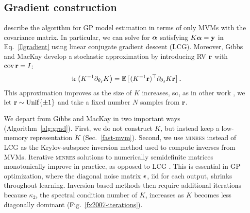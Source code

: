 \documentclass{article}
\begin{document}
\subsection{Gradient construction}

\citet{gibbs1996cient} describe the algorithm for GP model estimation in terms of only MVMs with the covariance matrix. In particular, we can solve for ${\boldsymbol\alpha}$ satisfying $K{\boldsymbol\alpha}=\textbf{y}$ in Eq.~\ref{llgradient} using linear conjugate gradient descent (LCG). Moreover, Gibbs and MacKay develop a stochastic approximation by introducing RV ${\textbf{r}}$ with $\operatorname{cov} {\textbf{r}}=I$:
\begin{align}
  \operatorname{tr}\left({K^{-1}\partial_{\theta_j}K}\right) = \operatorname{\mathbb{E}}\left[(K^{-1}{\textbf{r}})^\top\partial_{\theta_j}K{\textbf{r}}\right]\label{eq:trace}.
\end{align}
This approximation improves as the size of $K$ increases, so, as in other work \cite{cutajar2016preconditioning}, we let ${\textbf{r}}\sim\operatorname{Unif}\{\pm 1\}$ and take a fixed number $N$ samples from ${\textbf{r}}$.

We depart from Gibbs and MacKay in two important ways (Algorithm~\ref{alg:grad}). First, we do not construct $K$, but instead keep a low-memory representation $\tilde{K}$ (Sec.~\ref{fast-mvm}). Second, we use \textsc{minres} instead of LCG as the Krylov-subspace inversion method used to compute inverses from MVMs. Iterative \textsc{minres} solutions to numerically semidefinite matrices monotonically improve in practice, as opposed to LCG \cite{fong2012cg}. This is essential in GP optimization, where the diagonal noise matrix ${\boldsymbol\epsilon}$, iid for each output, shrinks throughout learning. Inversion-based methods then require additional iterations because $\kappa_2$, the spectral condition number of $K$, increases as $K$ becomes less diagonally dominant (Fig.~\ref{fx2007-iterations}).
\end{document}
